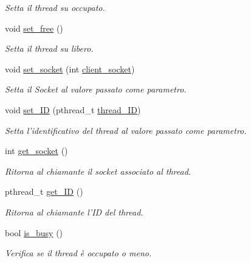 \begin{DoxyCompactItemize}
\begin{DoxyCompactList}\small\item\em Setta il {\itshape thread} su occupato. \end{DoxyCompactList}\item 
\hypertarget{class_threads_a06e59568497fd19f0fb115ffb40d25a5}{void \hyperlink{class_threads_a06e59568497fd19f0fb115ffb40d25a5}{set\-\_\-free} ()}\label{class_threads_a06e59568497fd19f0fb115ffb40d25a5}

\begin{DoxyCompactList}\small\item\em Setta il {\itshape thread} su libero. \end{DoxyCompactList}\item 
void \hyperlink{class_threads_a203c8939f82209d7d73ff4888f9de30e}{set\-\_\-socket} (int \hyperlink{class_threads_a5e30e204ecd4404d0f88514227b849a9}{client\-\_\-socket})
\begin{DoxyCompactList}\small\item\em Setta il {\itshape Socket} al valore passato come parametro. \end{DoxyCompactList}\item 
void \hyperlink{class_threads_ae976db915d6d729bf33b1368c9be191a}{set\-\_\-\-I\-D} (pthread\-\_\-t \hyperlink{class_threads_ab7e3c990d2c44c2352b4d9d682a5edaf}{thread\-\_\-\-I\-D})
\begin{DoxyCompactList}\small\item\em Setta l'identificativo del {\itshape thread} al valore passato come parametro. \end{DoxyCompactList}\item 
int \hyperlink{class_threads_a8c9867eae5ffe0142930e14f93194f82}{get\-\_\-socket} ()
\begin{DoxyCompactList}\small\item\em Ritorna al chiamante il {\itshape socket} associato al {\itshape thread}. \end{DoxyCompactList}\item 
pthread\-\_\-t \hyperlink{class_threads_ad044422afc205e16fb9104fe4cfa1a4f}{get\-\_\-\-I\-D} ()
\begin{DoxyCompactList}\small\item\em Ritorna al chiamante l'I\-D del {\itshape thread}. \end{DoxyCompactList}\item 
bool \hyperlink{class_threads_ad770694763602c65aa13388a380721c3}{is\-\_\-busy} ()
\begin{DoxyCompactList}\small\item\em Verifica se il {\itshape thread} è occupato o meno. \end{DoxyCompactList}\item 

\end{DoxyCompactItemize}
